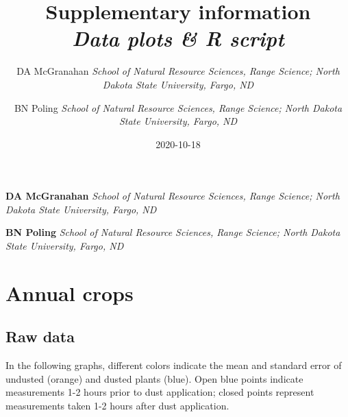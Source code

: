 \documentclass[]{scrartcl}
\title{Supplementary information \newline \\ \Large \emph{Data plots \& R script}   }
\date{2020-10-18}
\author{\Large DA McGranahan  \normalsize \emph{School of Natural Resource Sciences, Range Science; North Dakota State
University, Fargo, ND}   \and \Large BN Poling  \normalsize \emph{School of Natural Resource Sciences, Range Science; North Dakota State
University, Fargo, ND}  }
\newcommand*{\authorfont}{\fontfamily{phv}\selectfont}
\begin{document}
	
%

{%
\setlength{\parindent}{0pt}
\thispagestyle{plain}
{\fontsize{18}{20}\selectfont\raggedright 
\maketitle  %
}


{
   \vskip 13.5pt\relax \normalsize\fontsize{11}{12} 
\textbf{\authorfont DA McGranahan} \newline \hspace{0.1in} \vspace{0.05in}  \emph{\small School of Natural Resource Sciences, Range Science; North Dakota State
University, Fargo, ND}   \par \textbf{\authorfont BN Poling} \newline \hspace{0.1in} \vspace{0.05in}  \emph{\small School of Natural Resource Sciences, Range Science; North Dakota State
University, Fargo, ND}   

}

}


\date{}



\vskip 6.5pt

\noindent  \newpage

\hypertarget{annual-crops}{%
\section{Annual crops}\label{annual-crops}}

\hypertarget{raw-data}{%
\subsection{Raw data}\label{raw-data}}

In the following graphs, different colors indicate the mean and standard
error of undusted (orange) and dusted plants (blue). Open blue points
indicate measurements 1-2 hours prior to dust application; closed points
represent measurements taken 1-2 hours after dust application.
\end{document}
